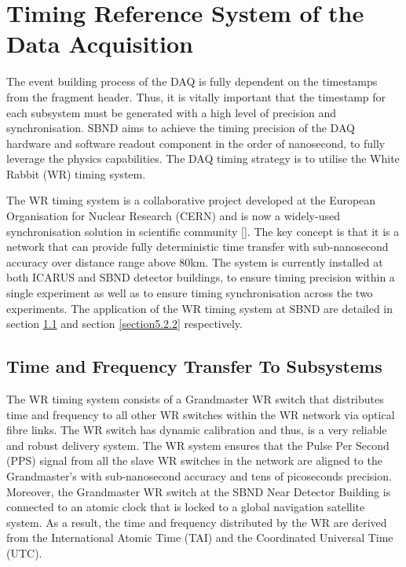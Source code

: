 \section{Timing Reference System of the Data Acquisition}
\label{section5.2}

The event building process of the DAQ is fully dependent on the timestamps from the fragment header. 
Thus, it is vitally important that the timestamp for each subsystem must be generated with a high level of precision and synchronisation.
SBND aims to achieve the timing precision of the DAQ hardware and software readout component in the order of nanosecond, to fully leverage the physics capabilities. 
The DAQ timing strategy is to utilise the White Rabbit (WR) timing system.

The WR timing system is a collaborative project developed at the European Organisation for Nuclear Research (CERN) and is now a widely-used synchronisation solution in scientific community \ref{}.
The key concept is that it is a network that can provide fully deterministic time transfer with sub-nanosecond accuracy over distance range above 80km.
The system is currently installed at both ICARUS and SBND detector buildings, to ensure timing precision within a single experiment as well as to ensure timing synchronisation across the two experiments. The application of the WR timing system at SBND are detailed in section \ref{section5.2.1} and section \ref{section5.2.2} respectively.

\subsection{Time and Frequency Transfer To Subsystems}
\label{section5.2.1}

The WR timing system consists of a Grandmaster WR switch that distributes time and frequency to all other WR switches within the WR network via optical fibre links.
The WR switch has dynamic calibration and thus, is a very reliable and robust delivery system.
The WR system ensures that the Pulse Per Second (PPS) signal from all the slave WR switches in the network are aligned to the Grandmaster's with sub-nanosecond accuracy and tens of picoseconds precision. 
Moreover, the Grandmaster WR switch at the SBND Near Detector Building is connected to an atomic clock that is locked to a global navigation satellite system. 
As a result, the time and frequency distributed by the WR are derived from the International Atomic Time (TAI) and the Coordinated Universal Time (UTC).

